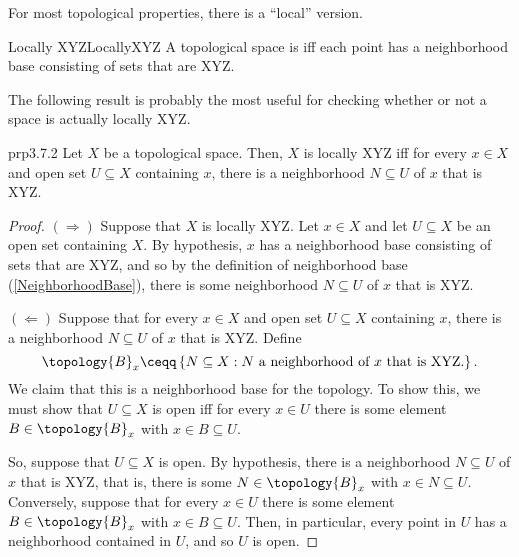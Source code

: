 For most topological properties, there is a ``local'' version.
\begin{mdf}{Locally XYZ}{LocallyXYZ}
A topological space is  iff each point has a neighborhood base consisting of sets that are XYZ.
\end{mdf}
The following result is probably the most useful for checking whether or not a space is actually locally XYZ.
\begin{mpr}{}{prp3.7.2}
Let $X$ be a topological space.  Then, $X$ is locally XYZ iff for every $x\in X$ and open set $U\subseteq X$ containing $x$, there is a neighborhood $N\subseteq U$ of $x$ that is XYZ.
\begin{proof}
$(\Rightarrow )$ Suppose that $X$ is locally XYZ.  Let $x\in X$ and let $U\subseteq X$ be an open set containing $X$.  By hypothesis, $x$ has a neighborhood base consisting of sets that are XYZ, and so by the definition of neighborhood base (\cref{NeighborhoodBase}), there is some neighborhood $N\subseteq U$ of $x$ that is XYZ.

\blankline
\noindent
$(\Leftarrow )$ Suppose that for every $x\in X$ and open set $U\subseteq X$ containing $x$, there is a neighborhood $N\subseteq U$ of $x$ that is XYZ.  Define
\begin{equation*}
\topology{B}_x\ceqq \left\{ N\subseteq X:N\text{ a neighborhood of }x\text{ that is XYZ.}\right\} .
\end{equation*}
We claim that this is a neighborhood base for the topology.  To show this, we must show that $U\subseteq X$ is open iff for every $x\in U$ there is some element $B\in \topology{B}_x$ with $x\in B\subseteq U$.

So, suppose that $U\subseteq X$ is open.  By hypothesis, there is a neighborhood $N\subseteq U$ of $x$ that is XYZ, that is, there is some $N\in \topology{B}_x$ with $x\in N\subseteq U$.  Conversely, suppose that for every $x\in U$ there is some element $B\in \topology{B}_x$ with $x\in B\subseteq U$.  Then, in particular, every point in $U$ has a neighborhood contained in $U$, and so $U$ is open.
\end{proof}
\end{mpr}

